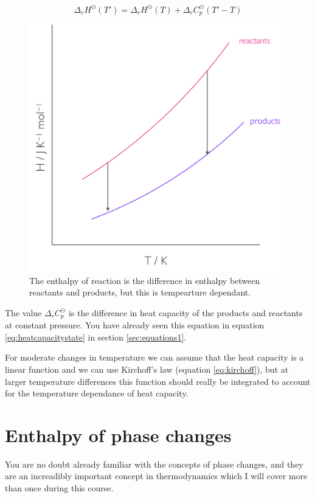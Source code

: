 \documentclass[
]{book}
\begin{document}
\begin{equation}
\Delta_r H^{\ominus} (T')=\Delta_r H^{\ominus} (T) + \Delta_r C_p^{\ominus} (T'-T)
\label{eq:kirchoff}
\end{equation}

\begin{figure}

{\centering \includegraphics[width=0.7\linewidth]{images/enthalpytemp} 

}

\caption{The enthalpy of reaction is the difference in enthalpy between reactants and products, but this is tempearture dependant.}\label{fig:enthalpytemp}
\end{figure}

The value \(\Delta_r C_p^{\ominus}\) is the difference in heat capacity of the products and reactants at constant pressure. You have already seen this equation in equation \eqref{eq:heatcapacitystate} in section \ref{sec:equations1}.

For moderate changes in temperature we can assume that the heat capacity is a linear function and we can use Kirchoff's law (equation \eqref{eq:kirchoff}), but at larger temperature differences this function should really be integrated to account for the temperature dependance of heat capacity.

\hypertarget{enthalpy-of-phase-changes}{%
\section{Enthalpy of phase changes}\label{enthalpy-of-phase-changes}}

You are no doubt already familiar with the concepts of phase changes, and they are an increadibly important concept in thermodynamics which I will cover more than once during this course.
\end{document}
